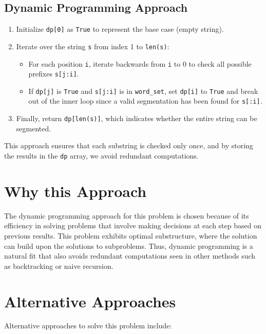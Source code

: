 \subsection*{Dynamic Programming Approach}
\begin{enumerate}
    \item Initialize \texttt{dp[0]} as \texttt{True} to represent the base case (empty string).
    
    \item Iterate over the string \texttt{s} from index 1 to \texttt{len(s)}:
    \begin{itemize}
        \item For each position \texttt{i}, iterate backwards from \texttt{i} to 0 to check all possible prefixes \texttt{s[j:i]}.
        \item If \texttt{dp[j]} is \texttt{True} and \texttt{s[j:i]} is in \texttt{word\_set}, set \texttt{dp[i]} to \texttt{True} and break out of the inner loop since a valid segmentation has been found for \texttt{s[:i]}.
    \end{itemize}
    
    \item Finally, return \texttt{dp[len(s)]}, which indicates whether the entire string can be segmented.
\end{enumerate}

This approach ensures that each substring is checked only once, and by storing the results in the \texttt{dp} array, we avoid redundant computations.

\section*{Why this Approach}

The dynamic programming approach for this problem is chosen because of its efficiency in solving problems that involve making decisions at each step based on previous results. This problem exhibits optimal substructure, where the solution can build upon the solutions to subproblems. Thus, dynamic programming is a natural fit that also avoids redundant computations seen in other methods such as backtracking or naive recursion.

\section*{Alternative Approaches}

Alternative approaches to solve this problem include:

